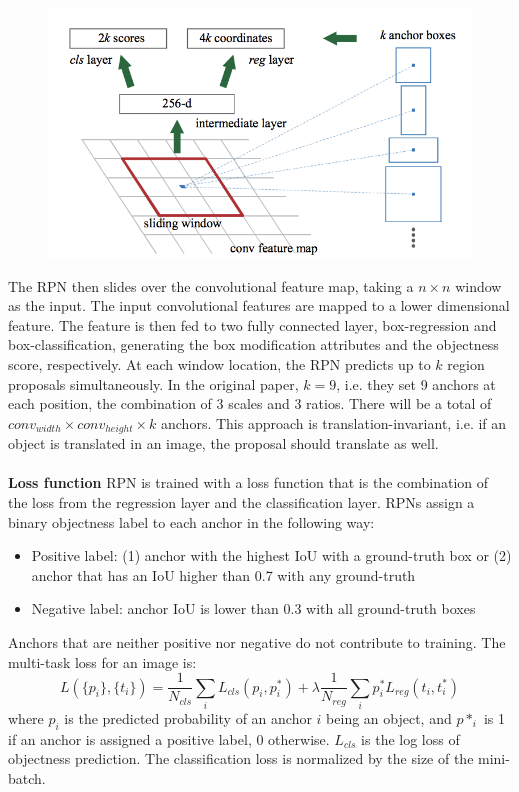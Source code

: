 \documentclass[12pt]{article}
\begin{document}
	\begin{figure}[H]
		\centering
		\includegraphics[width=0.5\linewidth]{figures/RPN}
	\end{figure}
	
	The RPN then slides over the convolutional feature map, taking a $n\times n$ window as the input. The input convolutional features are mapped to a lower dimensional feature. The feature is then fed to two fully connected layer, box-regression and box-classification, generating the box modification attributes and the objectness score, respectively. At each window location, the RPN predicts up to $k$ region proposals simultaneously. In the original paper, $k=9$, i.e. they set 9 anchors at each position, the combination of 3 scales and 3 ratios. There will be a total of $conv_{width}\times conv_{height} \times k$ anchors. This approach is translation-invariant, i.e. if an object is translated in an image, the proposal should translate as well.
	\\\\
	\textbf{Loss function}
	RPN is trained with a loss function that is the combination of the loss from the regression layer and the classification layer. RPNs assign a binary objectness label to each anchor in the following way:
	\begin{itemize}
		\item Positive label: (1) anchor with the highest IoU with a ground-truth box or (2) anchor that has an IoU higher than 0.7 with any ground-truth
		\item Negative label: anchor IoU is lower than 0.3 with all ground-truth boxes
	\end{itemize}
	Anchors that are neither positive nor negative do not contribute to training. The multi-task loss for an image is:
	\[L(\{p_i\},\{t_i\}) = \frac{1}{N_{cls}}\sum_{i}L_{cls}(p_i, p_i^*) + \lambda\frac{1}{N_{reg}}\sum_{i}p_i^*L_{reg}(t_i,t_i^*)\]
	where $p_i$ is the predicted probability of an anchor $i$ being an object, and $p*_i$ is 1 if an anchor is assigned a positive label, 0 otherwise. $L_{cls}$ is the log loss of objectness prediction. The classification loss is normalized by the size of the mini-batch.
\end{document}
